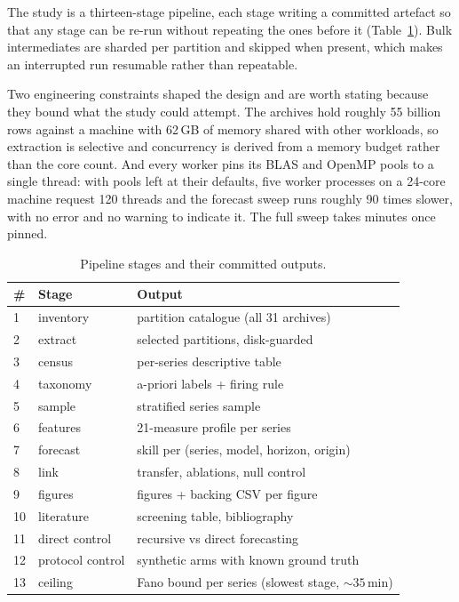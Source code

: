 \documentclass[11pt,a4paper]{article}
\newcommand{\num}[1]{#1}
\begin{document}
The study is a thirteen-stage pipeline, each stage writing a committed artefact so
that any stage can be re-run without repeating the ones before it
(Table~\ref{tab:pipeline}). Bulk intermediates are sharded per partition and
skipped when present, which makes an interrupted run resumable rather than
repeatable.

Two engineering constraints shaped the design and are worth stating because they
bound what the study could attempt. The archives hold roughly \num{55} billion
rows against a machine with \num{62}\,GB of memory shared with other workloads,
so extraction is selective and concurrency is derived from a memory budget rather
than the core count. And every worker pins its BLAS and OpenMP pools to a single
thread: with pools left at their defaults, five worker processes on a 24-core
machine request 120 threads and the forecast sweep runs roughly \num{90} times
slower, with no error and no warning to indicate it. The full sweep takes minutes
once pinned.

\begin{table}[t]
\centering
\caption{Pipeline stages and their committed outputs.}
\label{tab:pipeline}
\small
\begin{tabular}{llp{2.9cm}}
\toprule
\# & Stage & Output \\
\midrule
1 & inventory & partition catalogue (all 31 archives) \\
2 & extract & selected partitions, disk-guarded \\
3 & census & per-series descriptive table \\
4 & taxonomy & a-priori labels + firing rule \\
5 & sample & stratified series sample \\
6 & features & \num{21}-measure profile per series \\
7 & forecast & skill per (series, model, horizon, origin) \\
8 & link & transfer, ablations, null control \\
9 & figures & figures + backing CSV per figure \\
10 & literature & screening table, bibliography \\
11 & direct control & recursive vs direct forecasting \\
12 & protocol control & synthetic arms with known ground truth \\
13 & ceiling & Fano bound per series (slowest stage, ${\sim}35$\,min) \\
\bottomrule
\end{tabular}
\end{table}
\end{document}
